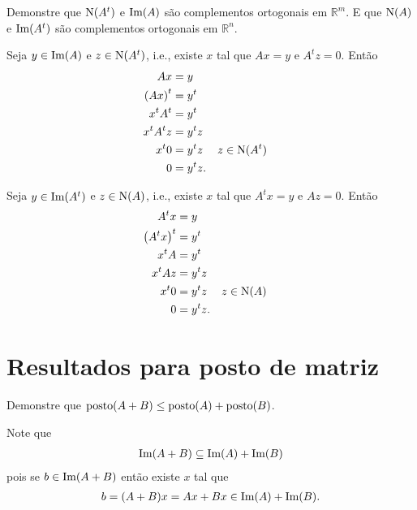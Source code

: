 \begin{questions}
    \question Demonstre que $\text{N} (A^t)$ e $\text{Im} (A)$ s\~{a}o complementos ortogonais em $\mathbb{R}^m$. E que $\text{N} (A)$ e $\text{Im} (A^t)$ s\~{a}o complementos ortogonais em $\mathbb{R}^n$.
    \begin{solution}
        Seja $y \in \text{Im} (A)$ e $z \in \text{N} (A^t)$, i.e., existe $x$ tal que $A x = y$ e $A^t z = 0$. Ent\~{a}o
        \begin{align*}
            A x &= y \\
            \left( A x \right)^t &= y^t \\
            x^t A^t &= y^t \\
            x^t A^t z &= y^t z \\
            x^t 0 &= y^t z && z \in \text{N} (A^t) \\
            0 &= y^t z.
        \end{align*}

        Seja $y \in \text{Im} (A^t)$ e $z \in \text{N}(A)$, i.e., existe $x$ tal que $A^t x = y$ e $A z = 0$. Ent\~{a}o
        \begin{align*}
            A^t x &= y \\
            \left( A^t x \right)^t &= y^t \\
            x^t A &= y^t \\
            x^t A z &= y^t z \\
            x^t 0 &= y^t z && z \in \text{N} (A) \\
            0 &= y^t z.
        \end{align*}
    \end{solution}

    \section*{Resultados para posto de matriz}

     Demonstre que $\text{posto} (A + B) \leq \text{posto} (A) + \text{posto} (B)$.
    \begin{solution}
        Note que
        \begin{align*}
            \text{Im}(A + B) \subseteq \text{Im}(A) + \text{Im}(B)
        \end{align*}
        pois se $b \in \text{Im}(A + B)$ ent\~{a}o existe $x$ tal que
        \begin{align*}
            b = (A + B) x = Ax + Bx \in \text{Im}(A) + \text{Im}(B).
        \end{align*}


\end{solution}
\end{questions}
